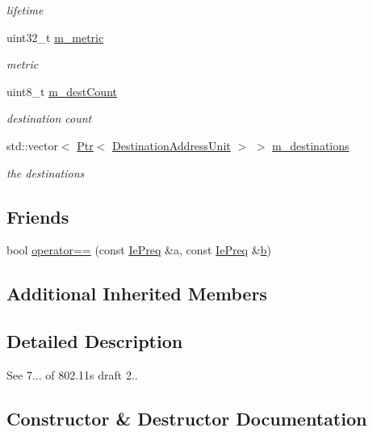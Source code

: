 \begin{DoxyCompactItemize}
\begin{DoxyCompactList}\small\item\em lifetime \end{DoxyCompactList}\item 
uint32\+\_\+t \hyperlink{classns3_1_1dot11s_1_1IePreq_ab4a0c5e3fc5fe2cd7c356d427899ff87}{m\+\_\+metric}
\begin{DoxyCompactList}\small\item\em metric \end{DoxyCompactList}\item 
uint8\+\_\+t \hyperlink{classns3_1_1dot11s_1_1IePreq_a086a0d3448eca1d39ada3a2918f2e46e}{m\+\_\+dest\+Count}
\begin{DoxyCompactList}\small\item\em destination count \end{DoxyCompactList}\item 
std\+::vector$<$ \hyperlink{classns3_1_1Ptr}{Ptr}$<$ \hyperlink{classns3_1_1dot11s_1_1DestinationAddressUnit}{Destination\+Address\+Unit} $>$ $>$ \hyperlink{classns3_1_1dot11s_1_1IePreq_aeea68330e912fe45ce815d6ec0d62c4c}{m\+\_\+destinations}
\begin{DoxyCompactList}\small\item\em the destinations \end{DoxyCompactList}\end{DoxyCompactItemize}
\subsection*{Friends}
\begin{DoxyCompactItemize}
\item 
bool \hyperlink{classns3_1_1dot11s_1_1IePreq_a74a43876450b4b9c43c97d8dcb2bda99}{operator==} (const \hyperlink{classns3_1_1dot11s_1_1IePreq}{Ie\+Preq} \&a, const \hyperlink{classns3_1_1dot11s_1_1IePreq}{Ie\+Preq} \&\hyperlink{lte__pathloss_8m_a21ad0bd836b90d08f4cf640b4c298e7c}{b})
\end{DoxyCompactItemize}
\subsection*{Additional Inherited Members}


\subsection{Detailed Description}
See 7... of 802.\+11s draft 2.. 

\subsection{Constructor \& Destructor Documentation}
